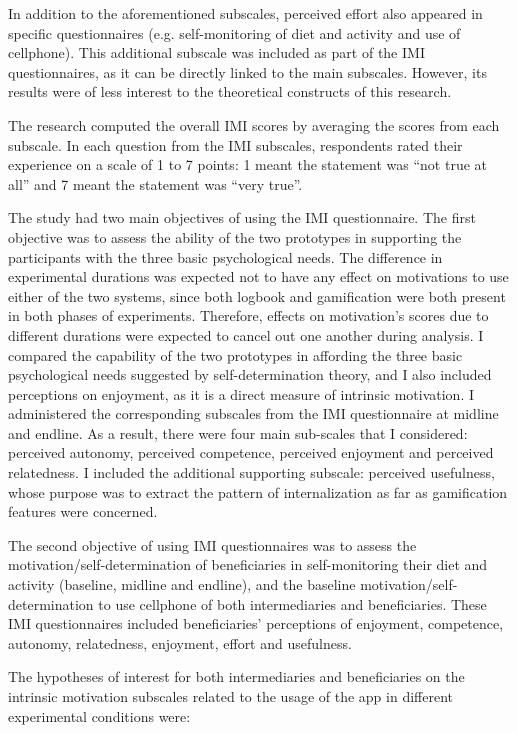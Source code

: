 In addition to the aforementioned subscales, perceived effort also appeared in specific questionnaires (e.g. self-monitoring of diet and activity and use of cellphone). This additional subscale was included as part of the IMI questionnaires, as it can be directly linked to the main subscales. However, its results were of less interest to the theoretical constructs of this research.
  
The research computed the overall IMI scores by averaging the scores from each subscale. In each question from the IMI subscales, respondents rated their experience on a scale of 1 to 7 points: 1 meant the statement was ``not true at all'' and 7 meant the statement was ``very true''.

The study had two main objectives of using the IMI questionnaire. The first objective was to assess the ability of the two prototypes in supporting the participants with the three basic psychological needs. The difference in experimental durations was expected not to have any effect on motivations to use either of the two systems, since both logbook and gamification were both present in both phases of experiments. Therefore, effects on motivation's scores due to different durations were expected to cancel out one another during analysis. I compared the capability of the two prototypes in affording the three basic psychological needs suggested by self-determination theory, and I also included perceptions on enjoyment, as it is a direct measure of intrinsic motivation. I administered the corresponding subscales from the IMI questionnaire at midline and endline. As a result, there were four main sub-scales that I considered: perceived autonomy, perceived competence, perceived enjoyment and perceived relatedness. I included the additional supporting subscale: perceived usefulness, whose purpose was to extract the pattern of internalization as far as gamification features were concerned.

The second objective of using IMI questionnaires was to assess the motivation/self-determination of beneficiaries in self-monitoring their diet and activity (baseline, midline  and endline), and the baseline motivation/self-determination to use cellphone of both intermediaries and beneficiaries. These IMI questionnaires included beneficiaries' perceptions of enjoyment, competence, autonomy, relatedness, enjoyment, effort and usefulness.

The hypotheses of interest for both intermediaries and beneficiaries on the intrinsic motivation subscales related to the usage of the app in different experimental conditions were:

